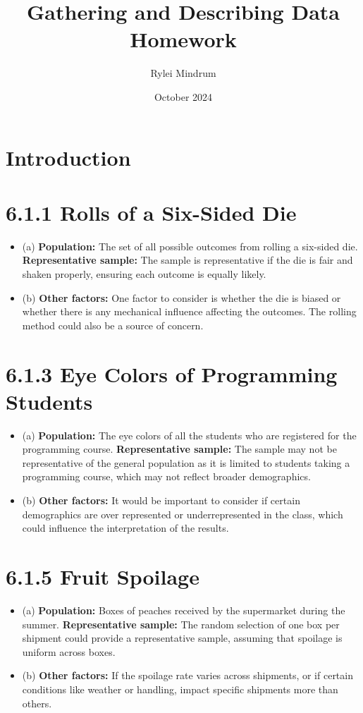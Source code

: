 \documentclass{article}
\title{Gathering and Describing Data Homework }
\author{Rylei Mindrum}
\date{October 2024}
\begin{document}
\maketitle

\section{Introduction}

\section*{6.1.1 Rolls of a Six-Sided Die}
\begin{itemize}
    \item (a) \textbf{Population:} The set of all possible outcomes from rolling a six-sided die.
    \newline \textbf{Representative sample:} The sample is representative if the die is fair and shaken properly, ensuring each outcome is equally likely.
    \item (b) \textbf{Other factors:} One factor to consider is whether the die is biased or whether there is any mechanical influence affecting the outcomes. The rolling method could also be a source of concern.
\end{itemize}

\section*{6.1.3 Eye Colors of Programming Students}
\begin{itemize}
    \item (a) \textbf{Population:} The eye colors of all the students who are registered for the programming course.
    \newline \textbf{Representative sample:} The sample may not be representative of the general population as it is limited to students taking a programming course, which may not reflect broader demographics.
    \item (b) \textbf{Other factors:} It would be important to consider if certain demographics are over represented or underrepresented in the class, which could influence the interpretation of the results.
\end{itemize}

\section*{6.1.5 Fruit Spoilage}
\begin{itemize}
    \item (a) \textbf{Population:} Boxes of peaches received by the supermarket during the summer.
    \newline \textbf{Representative sample:} The random selection of one box per shipment could provide a representative sample, assuming that spoilage is uniform across boxes.
    \item (b) \textbf{Other factors:} If the spoilage rate varies across shipments, or if certain conditions like weather or handling, impact specific shipments more than others.
\end{itemize}
\end{document}

